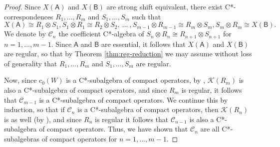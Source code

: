 \documentclass[11pt, letterpaper,final]{amsart}
\newcommand{\C}{{\mathcal{C}}}
\newcommand{\K}{{\mathcal{K}}}
\theoremstyle{definition}
\begin{document}
\begin{proof}
Since $X(\mathsf{A})$ and $X(\mathsf{B})$ are strong shift equivalent, there exist C*-correspondences $R_1,...,R_m$ and $S_1,...,S_m$ such that
\begin{equation} \label{eq:modsse}
X(\mathsf{A}) \cong R_1 \otimes S_1, S_1 \otimes R_1 \cong R_2 \otimes S_2, \ ... \ , S_{m-1}\otimes R_{m-1} \cong R_m \otimes S_m, S_m \otimes R_m \cong X(\mathsf{B}).
\end{equation}
We denote by $\C_n$ the coefficient C*-algebra of $S_n\otimes R_n \cong R_{n+1} \otimes S_{n+1}$ for $n=1,...,m-1$. Since $\mathsf{A}$ and $\mathsf{B}$ are essential, it follows that $X(\mathsf{A})$ and $X(\mathsf{B})$ are regular, so that by Theorem \ref{thm:reg-reduction} we may assume without loss of generality that $R_1,...,R_m$ and $S_1,...,S_m$ are regular.

Now, since $c_0(W)$ is a C*-subalgebra of compact operators, by \cite[Theorem~9(i)]{BG02}, $\K(R_m)$ is also a C*-subalgebra of compact operators, and since $R_m$ is regular, it follows that $\C_{m-1}$ is a C*-subalgebra of compact operators. We continue this by induction, so that if $\C_n$ is a C*-subalgebra of compact operators, then  $\K(R_n)$ is as well (by \cite[Theorem~9(i)]{BG02}), and since $R_n$ is regular it follows that $\C_{n-1}$ is also a C*-subalgebra of compact operators. Thus, we have shown that $\C_n$ are all C*-subalgebras of compact operators for $n=1,...,m-1$.


\end{proof}
\end{document}
